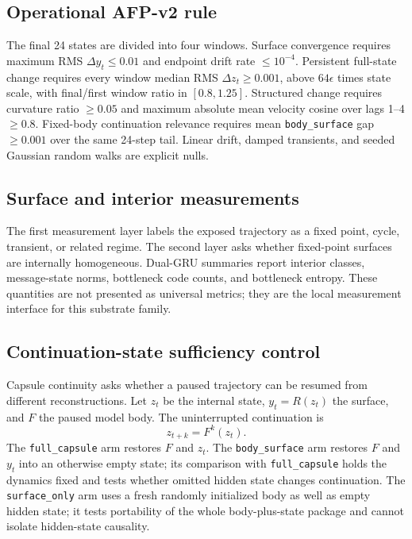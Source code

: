 \documentclass[11pt]{article}
\begin{document}
\subsection{Operational AFP-v2 rule}

The final 24 states are divided into four windows. Surface convergence requires
maximum RMS $\Delta y_t \leq 0.01$ and endpoint drift rate $\leq 10^{-4}$.
Persistent full-state change requires every window median RMS
$\Delta z_t \geq 0.001$, above $64\epsilon$ times state scale, with final/first
window ratio in $[0.8,1.25]$. Structured change requires curvature ratio
$\geq 0.05$ and maximum absolute mean velocity cosine over lags 1--4
$\geq 0.8$. Fixed-body
continuation relevance requires mean \texttt{body\_surface} gap $\geq 0.001$
over the same 24-step tail. Linear drift, damped transients, and seeded Gaussian
random walks are explicit nulls.

\subsection{Surface and interior measurements}

The first measurement layer labels the exposed trajectory as a fixed point,
cycle, transient, or related regime. The second layer asks whether fixed-point
surfaces are internally homogeneous. Dual-GRU summaries report interior
classes, message-state norms, bottleneck code counts, and bottleneck entropy.
These quantities are not presented as universal metrics; they are the local
measurement interface for this substrate family.

\subsection{Continuation-state sufficiency control}

Capsule continuity asks whether a paused trajectory can be resumed from
different reconstructions. Let $z_t$ be the internal state, $y_t=R(z_t)$ the
surface, and $F$ the paused model body. The uninterrupted continuation is
\[
  z_{t+k}=F^k(z_t).
\]
The \texttt{full\_capsule} arm restores $F$ and $z_t$. The
\texttt{body\_surface} arm restores $F$ and $y_t$ into an otherwise empty state;
its comparison with \texttt{full\_capsule} holds the dynamics fixed and tests
whether omitted hidden state changes continuation. The \texttt{surface\_only}
arm uses a fresh randomly initialized body as well as empty hidden state; it
tests portability of the whole body-plus-state package and cannot isolate
hidden-state causality.
\end{document}

